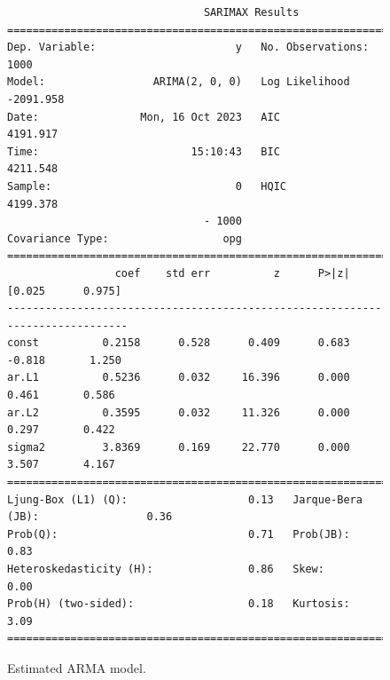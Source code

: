 \documentclass[12pt, a4paper]{article}
\begin{document}
\begin{figure}[H]
\footnotesize
\begin{verbatim}
                               SARIMAX Results
==============================================================================
Dep. Variable:                      y   No. Observations:                 1000
Model:                 ARIMA(2, 0, 0)   Log Likelihood               -2091.958
Date:                Mon, 16 Oct 2023   AIC                           4191.917
Time:                        15:10:43   BIC                           4211.548
Sample:                             0   HQIC                          4199.378
                               - 1000
Covariance Type:                  opg
==============================================================================
                 coef    std err          z      P>|z|      [0.025      0.975]
------------------------------------------------------------------------------
const          0.2158      0.528      0.409      0.683      -0.818       1.250
ar.L1          0.5236      0.032     16.396      0.000       0.461       0.586
ar.L2          0.3595      0.032     11.326      0.000       0.297       0.422
sigma2         3.8369      0.169     22.770      0.000       3.507       4.167
===================================================================================
Ljung-Box (L1) (Q):                   0.13   Jarque-Bera (JB):                 0.36
Prob(Q):                              0.71   Prob(JB):                         0.83
Heteroskedasticity (H):               0.86   Skew:                             0.00
Prob(H) (two-sided):                  0.18   Kurtosis:                         3.09
===================================================================================
\end{verbatim}
\caption{Estimated ARMA model.}\label{fig:ar2}
\end{figure}
\end{document}
